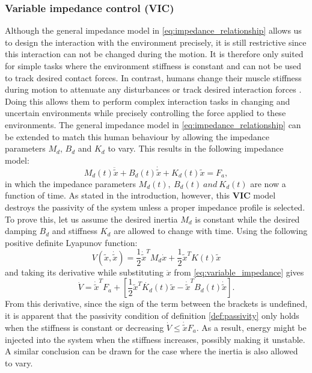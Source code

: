 \subsubsection{Variable impedance control (VIC)}
\label{section:variable_impedance_control}

Although the general impedance model in \eqref{eq:impedance_relationship} allows us to design the interaction with the environment precisely, it is still restrictive since this interaction can not be changed during the motion. It is therefore only suited for simple tasks where the environment stiffness is constant and can not be used to track desired contact forces. In contrast, humans change their muscle stiffness during motion to attenuate any disturbances or track desired interaction forces \cite{tomoriVariableImpedanceControl2013}. Doing this allows them to perform complex interaction tasks in changing and uncertain environments while precisely controlling the force applied to these environments. The general impedance model in \eqref{eq:impedance_relationship} can be extended to match this human behaviour by allowing the impedance parameters $M_d$, $B_d$ and $K_d$ to vary. This results in the following impedance model:
\begin{equation} \label{eq:variable_impedance}
  M_d\left(t \right)\ddot{\widetilde{ x }} + B_d \left( t \right)\dot{\widetilde{ x }} + K_d \left( t \right)\widetilde{ x }= F_a,
\end{equation}
in which the impedance parameters $M_d \left( t \right), \ B_d \left( t \right)\ and\ K_d \left( t \right)$ are now a function of time. As stated in the introduction, however, this \textbf{VIC} model destroys the passivity of the system unless a proper impedance profile is selected. To prove this, let us assume the desired inertia $M_d$ is constant while the desired damping $B_d$ and stiffness $K_d$ are allowed to change with time. Using the following positive definite Lyapunov function:
\begin{equation}
  V \left(\widetilde{ x }, \dot{\widetilde{ x }}\right)=\frac{ 1 }{ 2 }{\dot{\widetilde{ x }}}^T M_d \dot{ x }+\frac{ 1 }{ 2 }{\widetilde{ x }}^T K \left( t \right)\widetilde{ x }
\end{equation}
and taking its derivative while substituting $\ddot{ x }$ from \eqref{eq:variable_impedance} gives
\begin{equation} \label{eq:variable_impedance_derivative}
  \dot{V} = \dot{\widetilde{x}}^T F_a + \left[\frac{1}{2}\widetilde{x}^T \dot{K_d}\left(t \right)\widetilde{ x }-\dot{\widetilde{ x }}^T B_d \left( t \right)\dot{\widetilde{ x }}\right].
\end{equation}
From this derivative, since the sign of the term between the brackets is undefined, it is apparent that the passivity condition of definition \ref{def:passivity} only holds when the stiffness is constant or decreasing $\dot{V} \le \dot{\widetilde{x}} F_a$. As a result, energy might be injected into the system when the stiffness increases, possibly making it unstable. A similar conclusion can be drawn for the case where the inertia is also allowed to vary.

